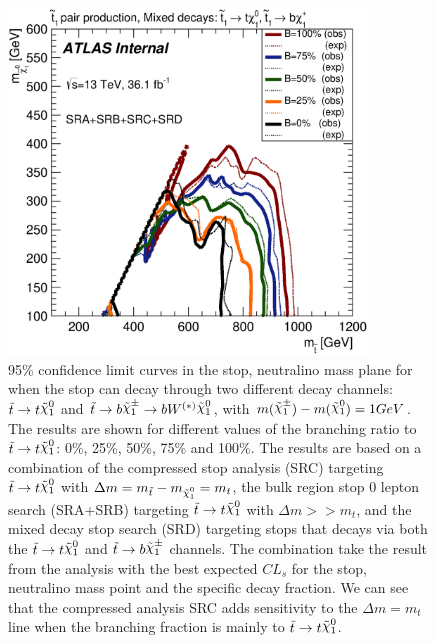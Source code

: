 \begin{figure}[h!]
	\begin{center}
		\includegraphics[width=0.85\textwidth]{figures/fit//SRABCD_mixed_dm1.eps}
		\caption[95\% confidence limit curves in the stop, neutralino mass plane for when the stop can decay through two different decay channels: $\stop\ra t\ninoone$
                  and $\stop\ra b\chinoonepm$]{
		95\% confidence limit curves in the stop, neutralino mass plane for when the stop can decay through two different decay channels: $\stop\ra t\ninoone$
                  and $\stop\ra b\chinoonepm\ra b W^{(*)}\ninoone$, with $m(\chinoonepm)-m(\ninoone) = 1 GeV$. 
		 The results are shown for different values of the
                  branching ratio to $\stop\ra t\ninoone$: 0\%, 25\%, 50\%, 75\% and 100\%.  
                  The results are based on a combination of the compressed stop analysis (SRC) targeting $\stop\ra t\ninoone$ with $\Delta m = m_{\stop} - m_{\ninoone} = m_{t}$, the bulk region stop 0 lepton search (SRA+SRB) targeting $\stop\ra t\ninoone$ with $\Delta m >> m_{t}$, and the mixed decay stop search (SRD) targeting stops that decays via both the $\stop\ra t\ninoone$ and $\stop\ra b\chinoonepm$ channels.  The combination take the result from the analysis with the best
                  expected $CL_s$ for the stop, neutralino mass point and the specific decay fraction. 
                   We can see that the compressed analysis SRC adds sensitivity to the $\Delta m = m_t$ line when the branching fraction is mainly to $\stop\ra t\ninoone$.}
		\label{figure.exclusion.SRABCD_dm1}
	\end{center}
\end{figure}
